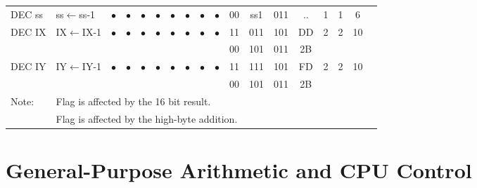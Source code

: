 \documentclass[oneside,a4paper]{book}
\newcommand{\instrt}{\rule{0pt}{2.7ex}}
\newcommand{\instrb}{\rule[-1.7ex]{0pt}{0pt}}
\newcommand{\notet}{\rule{0pt}{2.4ex}}
\newcommand{\noteb}{\rule[-1.3ex]{0pt}{0pt}}
\begin{document}
{\begin{tabular}{llcccccccccccccccl}
		DEC ss\instrt & 
			ss$\leftarrow$ss-1 &
			$\bullet$ & 
				$\bullet$ & 
				$\bullet$ & 
				$\bullet$ & 
				$\bullet$ & 
				$\bullet$ & 
				$\bullet$ & 
				$\bullet$ &
			00 & ss1 & 011 & 
			.. & 1 & 
			1 & 6 & \instrb \\

		DEC IX\instrt & 
			IX$\leftarrow$IX-1 &
			$\bullet$ & 
				$\bullet$ & 
				$\bullet$ & 
				$\bullet$ & 
				$\bullet$ & 
				$\bullet$ & 
				$\bullet$ & 
				$\bullet$ &
			11 & 011 & 101 & 
			DD & 2 & 
			2 & 10 & \\
		\multicolumn{10}{c}{} & 00 & 101 & 011 & 2B & \instrb \\

		DEC IY\instrt & 
			IY$\leftarrow$IY-1 &
			$\bullet$ & 
				$\bullet$ & 
				$\bullet$ & 
				$\bullet$ & 
				$\bullet$ & 
				$\bullet$ & 
				$\bullet$ & 
				$\bullet$ &
			11 & 111 & 101 & 
			FD & 2 & 
			2 & 10 & \\
		\multicolumn{10}{c}{} & 00 & 101 & 011 & 2B & \instrb \\
		
		\hline

		Note:
			& \multicolumn{17}{l}{\parbox{12cm}{\footnotemark[1]Flag is affected by the 16 bit result.}}\notet \\
			& \multicolumn{17}{l}{\parbox{12cm}{\footnotemark[2]Flag is affected by the high-byte addition.}}\noteb \\
			
		\hline

	\end{tabular}
}


\section{General-Purpose Arithmetic and CPU Control}
\end{document}
